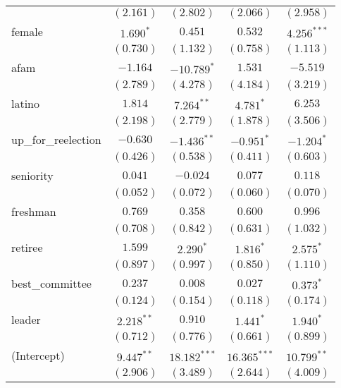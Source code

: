 \documentclass[12pt]{article}
\begin{document}
\begin{table}
\begin{center}
\begin{tabular}{l c c c c }
			& $(2.161)$      & $(2.802)$       & $(2.066)$      & $(2.958)$     \\
			female                 & $1.690^{*}$    & $0.451$         & $0.532$        & $4.256^{***}$ \\
			& $(0.730)$      & $(1.132)$       & $(0.758)$      & $(1.113)$     \\
			afam                   & $-1.164$       & $-10.789^{*}$   & $1.531$        & $-5.519$      \\
			& $(2.789)$      & $(4.278)$       & $(4.184)$      & $(3.219)$     \\
			latino                 & $1.814$        & $7.264^{**}$    & $4.781^{*}$    & $6.253$       \\
			& $(2.198)$      & $(2.779)$       & $(1.878)$      & $(3.506)$     \\
			up\_for\_reelection    & $-0.630$       & $-1.436^{**}$   & $-0.951^{*}$   & $-1.204^{*}$  \\
			& $(0.426)$      & $(0.538)$       & $(0.411)$      & $(0.603)$     \\
			seniority              & $0.041$        & $-0.024$        & $0.077$        & $0.118$       \\
			& $(0.052)$      & $(0.072)$       & $(0.060)$      & $(0.070)$     \\
			freshman               & $0.769$        & $0.358$         & $0.600$        & $0.996$       \\
			& $(0.708)$      & $(0.842)$       & $(0.631)$      & $(1.032)$     \\
			retiree                & $1.599$        & $2.290^{*}$     & $1.816^{*}$    & $2.575^{*}$   \\
			& $(0.897)$      & $(0.997)$       & $(0.850)$      & $(1.110)$     \\
			best\_committee        & $0.237$        & $0.008$         & $0.027$        & $0.373^{*}$   \\
			& $(0.124)$      & $(0.154)$       & $(0.118)$      & $(0.174)$     \\
			leader                 & $2.218^{**}$   & $0.910$         & $1.441^{*}$    & $1.940^{*}$   \\
			& $(0.712)$      & $(0.776)$       & $(0.661)$      & $(0.899)$     \\
			(Intercept)            & $9.447^{**}$   & $18.182^{***}$  & $16.365^{***}$ & $10.799^{**}$ \\
			& $(2.906)$      & $(3.489)$       & $(2.644)$      & $(4.009)$     \\

\end{tabular}
\end{center}
\end{table}
\end{document}
